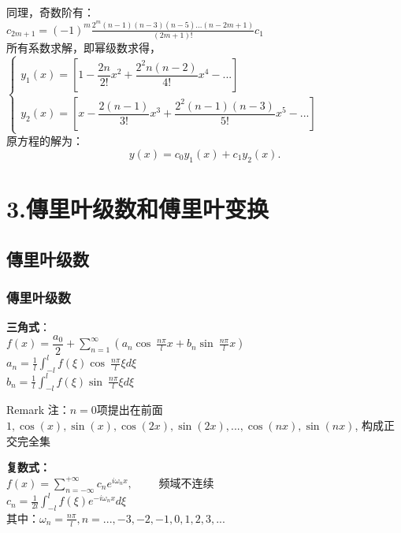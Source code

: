 \begin{frame}	
	同理，奇数阶有：\\
	{ $\displaystyle
		c_{2m+1} = (-1) ^m \frac{2^m (n-1) (n-3)(n-5)...(n-2m+1)  } {(2m+1)!} c_1$}\\ \vspace{0.3cm}
	所有系数求解，即幂级数求得，\\
	$\displaystyle \begin{cases}
		y_1(x)  = [1- \dfrac{2n}{2!} x^2+ \dfrac{2^2n(n-2)}{4!} x^4 -...  ] \\
		y_2(x)  = [x- \dfrac{2(n-1)}{3!} x^3+ \dfrac{2^2(n-1)(n-3) }{5!}x^5 -...  ]
	\end{cases}$ \\ \vspace{0.3cm}
	原方程的解为：
	\begin{equation*}
		y(x) =c_0y_1(x)+c_1 y_2(x).
	\end{equation*}   
\end{frame}

\section{3.傳里叶级数和傅里叶变换}
\subsection{傳里叶级数 }

\begin{frame}
\frametitle{傳里叶级数}
	\textbf{\large 三角式}：\\
	{\large  $\displaystyle f(x) =\dfrac{a_0}{2} +\sum_{n=1}^{\infty}  \left(  a_n \cos~ \frac{n\pi}{l} x +  b_n \sin~ \frac{n\pi}{l} x  \right) $ }\\	
	{\large $\displaystyle a_n =\frac{1}{l}  \int_{-l}^{l}  f(\xi )   \cos~ \frac{n\pi}{l} \xi d\xi  $ }\\	
	{\large $\displaystyle b_n =\frac{1}{l}  \int_{-l}^{l}  f(\xi )   \sin~ \frac{n\pi}{l} \xi d\xi   $ }\\	
	
	\begin{block} {Remark}
	注：$n=0$项提出在前面 \\
	$1, \cos(x), \sin (x), \cos(2x), \sin (2x), ..., \cos(nx), \sin (nx) $, 构成正交完全集
	\end{block}
\end{frame}

\begin{frame}
	\textbf{ \large 复数式：} \\  
	{\large  $\displaystyle f(x) =\sum_{n=-\infty}^{+\infty}  c_n e^{i\omega_n x}, \qquad $  频域不连续 }\\	
	{\large $\displaystyle c_n =\frac{1}{2l}  \int_{-l}^{l}  f(\xi)    e^{-i\omega_n x}  d\xi  $ }\\	
	其中：{\large $\displaystyle   \omega_n=\frac{n\pi}{l} ,  n=...,-3,-2,-1,0,1,2,3,...   $} \\
\end{frame}

